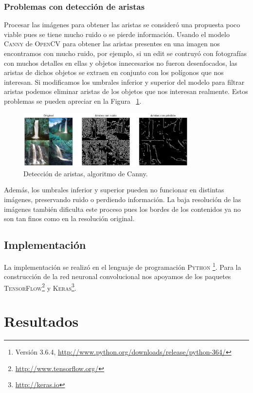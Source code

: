 \documentclass[spanish,11pt,letterpaper]{article}
\begin{document}
\subsubsection{Problemas con detección de aristas}

Procesar las imágenes para obtener las aristas se consideró una propuesta poco
viable pues se tiene mucho ruido o se pierde información. Usando el modelo
\textsc{Canny} de \textsc{OpenCV} para obtener las aristas presentes en una imagen
nos encontramos con mucho ruido, por ejemplo, si un edit se contruyó con fotografías
con muchos detalles en ellas y objetos innecesarios no fueron desenfocados, las
aristas de dichos objetos se extraen en conjunto con los polígonos que nos
interesan. Si modificamos los umbrales inferior y superior del modelo para filtrar
aristas podemos eliminar aristas de los objetos que nos interesan realmente. Estos
problemas se pueden apreciar en la Figura ~\ref{fig:canny}.

\begin{figure}[h]
\centering
\includegraphics[width=0.8\textwidth]{edges}
\caption{Detección de aristas, algoritmo de Canny.}
\label{fig:canny}
\end{figure}

Además, los umbrales inferior y superior pueden no funcionar en distintas imágenes,
preservando ruido o perdiendo información. La baja resolución de las imágenes
también dificulta este proceso pues los bordes de los contenidos ya no son tan
finos como en la resolución original.

\subsection{Implementación}

La implementación se realizó en el lenguaje de programación \textsc{Python}%
\footnote{Versión 3.6.4, \url{http://www.python.org/downloads/release/python-364/}}.
Para la construcción de la red neuronal convolucional nos apoyamos de los
paquetes \textsc{TensorFlow}\footnote{\url{http://www.tensorflow.org/}} y
\textsc{Keras}\footnote{\url{http://keras.io}}.

\section{Resultados}
\end{document}
